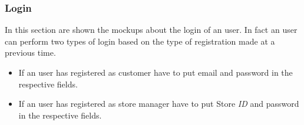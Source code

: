 \documentclass{article}
\begin{document}
		\newpage
		
		\subsubsection{Login}
		In this section are shown the mockups about the login of an user. In fact an user can perform two types of login based on the type of registration made at a previous time.
		\begin{itemize}
			\item If an user has registered as customer have to put email and password in the respective fields.
			\item If an user has registered as store manager have to put Store \emph{ID} and password in the respective fields.
		\end{itemize}
		\bigskip
		\bigskip
		\begin{figure}[!h]
			\centering
			\begin{minipage}[!h]{0.4\textwidth}

\end{minipage}
\end{figure}
\end{document}
